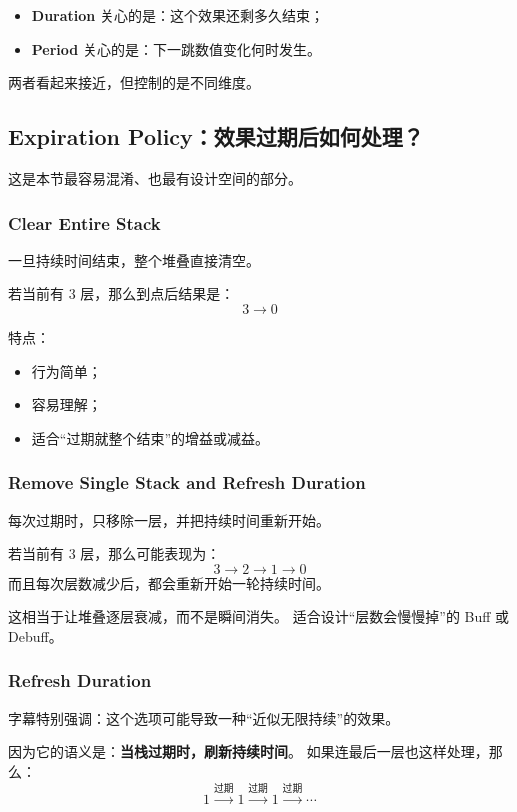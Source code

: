 \begin{itemize}
	\item \textbf{Duration} 关心的是：这个效果还剩多久结束；
	\item \textbf{Period} 关心的是：下一跳数值变化何时发生。
\end{itemize}

两者看起来接近，但控制的是不同维度。

\subsection{Expiration Policy：效果过期后如何处理？}

这是本节最容易混淆、也最有设计空间的部分。

\subsubsection{Clear Entire Stack}

一旦持续时间结束，整个堆叠直接清空。

若当前有 $3$ 层，那么到点后结果是：
\[
3 \to 0
\]

特点：
\begin{itemize}
	\item 行为简单；
	\item 容易理解；
	\item 适合“过期就整个结束”的增益或减益。
\end{itemize}

\subsubsection{Remove Single Stack and Refresh Duration}

每次过期时，只移除一层，并把持续时间重新开始。

若当前有 $3$ 层，那么可能表现为：
\[
3 \to 2 \to 1 \to 0
\]
而且每次层数减少后，都会重新开始一轮持续时间。

这相当于让堆叠逐层衰减，而不是瞬间消失。  
适合设计“层数会慢慢掉”的 Buff 或 Debuff。

\subsubsection{Refresh Duration}

字幕特别强调：这个选项可能导致一种“近似无限持续”的效果。

因为它的语义是：\textbf{当栈过期时，刷新持续时间}。  
如果连最后一层也这样处理，那么：
\[
1 \xrightarrow{\text{过期}} 1 \xrightarrow{\text{过期}} 1 \xrightarrow{\text{过期}} \cdots
\]


